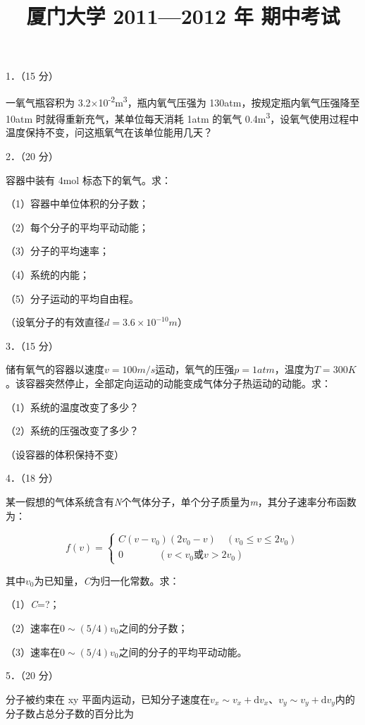 \documentclass[fontset=exam]{exam-zh}
\title{厦门大学 2011—2012 年 期中考试}
\begin{document}
\maketitle
{}
1．（15 分）

一氧气瓶容积为 3.2×10\textsuperscript{-2}m\textsuperscript{3}，瓶内氧气压强为 130atm，按规定瓶内氧气压强降至 10atm 时就得重新充气，某单位每天消耗 1atm 的氧气 0.4m\textsuperscript{3}，设氧气使用过程中温度保持不变，问这瓶氧气在该单位能用几天？

2．（20 分）

容器中装有 4mol 标态下的氧气。求：

（1）容器中单位体积的分子数；

（2）每个分子的平均平动动能；

（3）分子的平均速率；

（4）系统的内能；

（5）分子运动的平均自由程。

（设氧分子的有效直径\(d = 3.6 \times 10^{- 10}m\)）

3．（15 分）

储有氧气的容器以速度\(v = 100m/s\)运动，氧气的压强\(p = 1atm\)，温度为\(T = 300K\)。该容器突然停止，全部定向运动的动能变成气体分子热运动的动能。求：

（1）系统的温度改变了多少？

（2）系统的压强改变了多少？

（设容器的体积保持不变）

4．（18 分）

某一假想的气体系统含有\emph{N}个气体分子，单个分子质量为\emph{m}，其分子速率分布函数为：

\[f(v) = \left\{ \begin{matrix}
{C(v - v_{0})(2v_{0} - v)\quad(v_{0} \leq v \leq 2v_{0})} \\
{0\quad\quad\quad\;\;(v < v_{0}\text{或}v > 2v_{0})}
\end{matrix} \right.\]

其中\(v_{0}\)为已知量，\emph{C}为归一化常数。求：

（1）\emph{C}=?；

（2）速率在\(\left. 0 \right.\sim(5/4)v_{0}\)之间的分子数；

（3）速率在\(\left. 0 \right.\sim(5/4)v_{0}\)之间的分子的平均平动动能。

5．（20 分）

分子被约束在 xy 平面内运动，已知分子速度在\(\left. v_{x} \right.\sim v_{x} + \text{d}v_{x}\)、\(\left. v_{y} \right.\sim v_{y} + \text{d}v_{y}\)内的分子数占总分子数的百分比为
\end{document}
